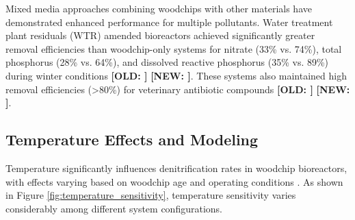 \documentclass[12pt,a4paper]{article}
\newcommand{\replaced}[2]{\textcolor{deletedtext}{\textbf{[OLD: #1]}} \textcolor{replacedtext}{\textbf{[NEW: #2]}}}
\begin{document}
Mixed media approaches combining woodchips with other materials have demonstrated enhanced performance for multiple pollutants. Water treatment plant residuals (WTR) amended bioreactors achieved significantly greater removal efficiencies than woodchip-only systems for nitrate (33\% vs. 74\%), total phosphorus (28\% vs. 64\%), and dissolved reactive phosphorus (35\% vs. 89\%) during winter conditions \replaced{\citep{RN282}}{\citep{RN370}}. These systems also maintained high removal efficiencies (>80\%) for veterinary antibiotic compounds \replaced{\citep{RN282}}{\citep{RN370}}.

\subsection{Temperature Effects and Modeling}

Temperature significantly influences denitrification rates in woodchip bioreactors, with effects varying based on woodchip age and operating conditions \citep{RN228, RN242}. As shown in Figure \ref{fig:temperature_sensitivity}, temperature sensitivity varies considerably among different system configurations.
\end{document}

